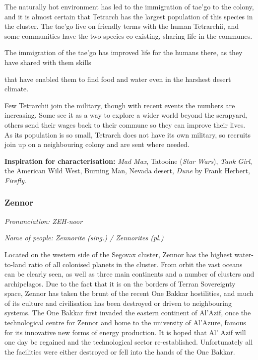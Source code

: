 The naturally hot environment has led to the immigration of tae'go to the colony, and it is almost certain that Tetrarch has the largest population of this species in the cluster. The tae'go live on friendly terms with the human Tetrarchii, and some communities have the two species co-existing, sharing life in the communes.

The immigration of the tae'go has improved life for the humans there, as they have shared with them skills

that have enabled them to find food and water even in the harshest desert climate.

Few Tetrarchii join the military, though with recent events the numbers are increasing. Some see it as a way to explore a wider world beyond the scrapyard, others send their wages back to their commune so they can improve their lives. As its population is so small, Tetrarch does not have its own military, so recruits join up on a neighbouring colony and are sent where needed.

\textbf{Inspiration for characterisation:} \textit{Mad Max}, Tatooine (\textit{Star Wars}), \textit{Tank Girl}, the American Wild West, Burning Man, Nevada desert, \textit{Dune} by Frank Herbert, \textit{Firefly}.

\subsubsection{Zennor}

\textit{Pronunciation: ZEH-noor}

\textit{Name of people: Zennorite (sing.) / Zennorites (pl.)}

Located on the western side of the Segovax cluster, Zennor has the highest water-to-land ratio of all colonised planets in the cluster. From orbit the vast oceans can be clearly seen, as well as three main continents and a number of clusters and archipelagos. Due to the fact that it is on the borders of Terran Sovereignty space, Zennor has taken the brunt of the recent One Bakkar hostilities, and much of its culture and civilisation has been destroyed or driven to neighbouring systems. The One Bakkar first invaded the eastern continent of Al'Azif, once the technological centre for Zennor and home to the university of Al'Azure, famous for its innovative new forms of energy production. It is hoped that Al' Azif will one day be regained and the technological sector re-established. Unfortunately all the facilities were either destroyed or fell into the hands of the One Bakkar.

